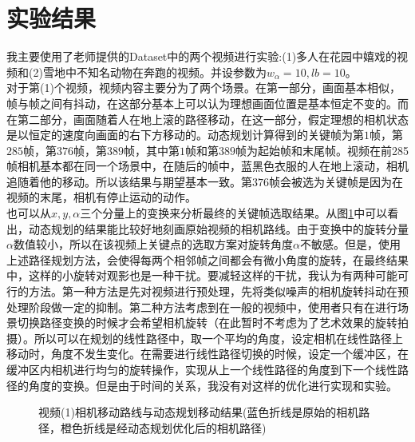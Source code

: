 \documentclass[journal, a4paper]{IEEEtran}
\begin{document}
    
\section{实验结果}
    我主要使用了老师提供的Dataset中的两个视频进行实验:(1)多人在花园中嬉戏的视频和(2)雪地中不知名动物在奔跑的视频。并设参数为$w_\alpha =10,lb=10$。 \\
    
    对于第(1)个视频，视频内容主要分为了两个场景。在第一部分，画面基本相似，帧与帧之间有抖动，在这部分基本上可以认为理想画面位置是基本恒定不变的。而在第二部分，画面随着人在地上滚的路径移动，在这一部分，假定理想的相机状态是以恒定的速度向画面的右下方移动的。动态规划计算得到的关键帧为第$1$帧，第$285$帧，第$376$帧，第$389$帧，其中第$1$帧和第$389$帧为起始帧和末尾帧。视频在前285帧相机基本都在同一个场景中，在随后的帧中，蓝黑色衣服的人在地上滚动，相机追随着他的移动。所以该结果与期望基本一致。第$376$帧会被选为关键帧是因为在视频的末尾，相机有停止运动的动作。\\
    
    也可以从$x,y,\alpha$三个分量上的变换来分析最终的关键帧选取结果。从图\ref{fig:DP_motion_c}中可以看出，动态规划的结果能比较好地刻画原始视频的相机路线。由于变换中的旋转分量$\alpha$数值较小，所以在该视频上关键点的选取方案对旋转角度$\alpha$不敏感。但是，使用上述路径规划方法，会使得每两个相邻帧之间都会有微小角度的旋转，在最终结果中，这样的小旋转对观影也是一种干扰。要减轻这样的干扰，我认为有两种可能可行的方法。第一种方法是先对视频进行预处理，先将类似噪声的相机旋转抖动在预处理阶段做一定的抑制。第二种方法考虑到在一般的视频中，使用者只有在进行场景切换路径变换的时候才会希望相机旋转（在此暂时不考虑为了艺术效果的旋转拍摄）。所以可以在规划的线性路径中，取一个平均的角度，设定相机在线性路径上移动时，角度不发生变化。在需要进行线性路径切换的时候，设定一个缓冲区，在缓冲区内相机进行均匀的旋转操作，实现从上一个线性路径的角度到下一个线性路径的角度的变换。但是由于时间的关系，我没有对这样的优化进行实现和实验。\\
    \begin{figure}[!hbt]
      \begin{center}
          \caption{视频(1)相机移动路线与动态规划移动结果(蓝色折线是原始的相机路径，橙色折线是经动态规划优化后的相机路径)}
          \label{fig:DP_motion_c}
      \end{center}
    \end{figure}
    
\end{document}
